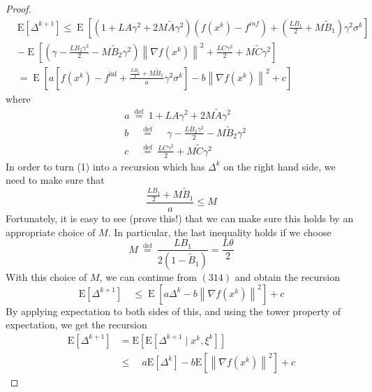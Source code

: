 \documentclass[12pt,a4paper]{article}
\DeclareMathOperator{\E}{\mathrm{E}}
\begin{document}
\begin{proof}
	$$
	\begin{aligned}
		&\mathrm{E}\left[\Delta^{k+1} \right] {\leq} \E\left[\left(1+L A \gamma^{2}+2 M \tilde{A} \gamma^{2}\right)\left(f\left(x^{k}\right)-f^{i n f}\right)+\left(\frac{L B_{1}}{2}+M \tilde{B}_{1}\right) \gamma^{2} \sigma^{k}\right]\\
		&-\E\left[\left(\gamma-\frac{L B_{2} \gamma^{2}}{2}-M \tilde{B}_{2} \gamma^{2}\right)\left\|\nabla f\left(x^{k}\right)\right\|^{2}+\frac{L C \gamma^{2}}{2}+M \tilde{C} \gamma^{2}\right]\\
		&=\E\left[a\left[f\left(x^{k}\right)-f^{\inf }+\frac{\frac{L B_{1}}{2}+M \tilde{B}_{1}}{a} \gamma^{2} \sigma^{k}\right]-b\left\|\nabla f\left(x^{k}\right)\right\|^{2}+c\right]
	\end{aligned}
	$$
	where
	$$
	\begin{aligned}
		&a \stackrel{\text { def }}{=} 1+L A \gamma^{2}+2 M \tilde{A} \gamma^{2} \\
		&b \quad \stackrel{\text { def }}{=} \quad \gamma-\frac{L B_{2} \gamma^{2}}{2}-M \tilde{B}_{2} \gamma^{2} \\
		&c \quad \stackrel{\text { def }}{=} \frac{L C \gamma^{2}}{2}+M \tilde{C} \gamma^{2}
	\end{aligned}
	$$
	In order to turn (1) into a recursion which has $\Delta^{k}$ on the right hand side, we need to make sure that
	$$
	\frac{\frac{L B_{1}}{2}+M \tilde{B}_{1}}{a} \leq M
	$$
	Fortunately, it is easy to see (prove this!) that we can make sure this holds by an appropriate choice of $M$. In particular, the last inequality  holds if we choose
	$$
	M \stackrel{\text { def }}{=} \frac{L B_{1}}{2\left(1-\tilde{B}_{1}\right)}=\frac{L \theta}{2}
	$$
	With this choice of $M$, we can continue from $(314)$ and obtain the recursion
	\begin{equation}
	\mathrm{E}\left[\Delta^{k+1} \right] \quad {\leq}\E\left[ a \Delta^{k}-b\left\|\nabla f\left(x^{k}\right)\right\|^{2}\right]+c
	\end{equation}
	By applying expectation to both sides of this, and using the tower property of expectation, we get the recursion
	\begin{equation}
	\begin{aligned}
		\mathrm{E}\left[\Delta^{k+1}\right] &=\mathrm{E}\left[\mathrm{E}\left[\Delta^{k+1} \mid x^{k}, \xi^{k}\right]\right] \\
		& {\leq} \quad a \mathrm{E}\left[\Delta^{k}\right]-b \mathrm{E}\left[\left\|\nabla f\left(x^{k}\right)\right\|^{2}\right]+c
	\end{aligned}

\end{equation}
\end{proof}
\end{document}
